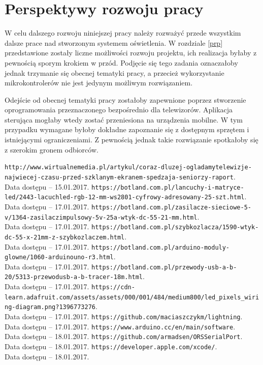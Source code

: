 \documentclass[12pt]{report}
\begin{document}
\section{Perspektywy rozwoju pracy}

W celu dalszego rozwoju niniejszej pracy należy rozważyć przede wszystkim dalsze prace nad stworzonym systemem oświetlenia. W rozdziale \ref{prp} przedstawione zostały liczne możliwości rozwoju projektu, ich realizacja byłaby z pewnością sporym krokiem w przód. Podjęcie się tego zadania oznaczałoby jednak trzymanie się obecnej tematyki pracy, a przecież wykorzystanie mikrokontrolerów nie jest jedynym możliwym rozwiązaniem. 

Odejście od obecnej tematyki pracy zostałoby zapewnione poprzez stworzenie oprogramowania przeznaczonego bezpośrednio dla telewizorów. Aplikacja steru\-jąca mogłaby wtedy zostać przeniesiona na urządzenia mobilne. W tym przypadku wymagane byłoby dokładne zapoznanie się z dostępnym sprzętem i istniejącymi ograniczeniami. Z pewnością jednak takie rozwiązanie spotkałoby się z szerokim gronem odbiorców.

\begin{thebibliography}{99}
 {\tt http://www.wirtualnemedia.pl/artykul/coraz-dluzej-ogladamy\-telewizje-najwiecej-czasu-przed-szklanym-ekranem-spedzaja\--seniorzy-raport}.\\Data dostępu -- 15.01.2017.
 {\tt https://botland.com.pl/lancuchy-i-matryce-led/2443-lacuch\-led-rgb-12-mm-ws2801-cyfrowy-adresowany-25-szt.html}.\\Data dostępu -- 17.01.2017.
 {\tt https://botland.com.pl/zasilacze-sieciowe-5-v/1364-zasilacz\-impulsowy-5v-25a-wtyk-dc-55-21-mm.html}.\\Data dostępu -- 17.01.2017.
 {\tt https://botland.com.pl/szybkozlacza/1590-wtyk-dc-55-x-21\-mm-z-szybkozlaczem.html}.\\Data dostępu -- 17.01.2017.
 {\tt https://botland.com.pl/arduino-moduly-glowne/1060-arduino\-uno-r3.html}.\\Data dostępu -- 17.01.2017.
 {\tt https://botland.com.pl/przewody-usb-a-b-20/5313-przewod\-usb-a-b-tracer-18m.html}.\\Data dostępu -- 17.01.2017.
 {\tt https://cdn-learn.adafruit.com/assets/assets/000/001/484/\-medium800/led\_pixels\_wiring-diagram.png?1396773276}.\\Data dostępu -- 17.01.2017.
 {\tt https://github.com/maciaszczykm/lightning}.\\Data dostępu -- 17.01.2017.
 {\tt https://www.arduino.cc/en/main/software}.\\Data dostępu -- 18.01.2017.
 {\tt https://github.com/armadsen/ORSSerialPort}.\\Data dostępu -- 18.01.2017.
 {\tt https://developer.apple.com/xcode/}.\\Data dostępu -- 18.01.2017.
\end{thebibliography}

\listoffigures

\listoftables

\lstlistoflistings
\end{document}
